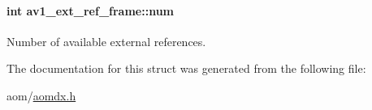 \paragraph[{\texorpdfstring{num}{num}}]{\setlength{\rightskip}{0pt plus 5cm}int av1\+\_\+ext\+\_\+ref\+\_\+frame\+::num}\hypertarget{structav1__ext__ref__frame_a2d249bb9aee60c4b6c67e64b1694bc2f}{}\label{structav1__ext__ref__frame_a2d249bb9aee60c4b6c67e64b1694bc2f}
Number of available external references. 

The documentation for this struct was generated from the following file\+:\begin{DoxyCompactItemize}
\item 
aom/\hyperlink{aomdx_8h}{aomdx.\+h}\end{DoxyCompactItemize}
